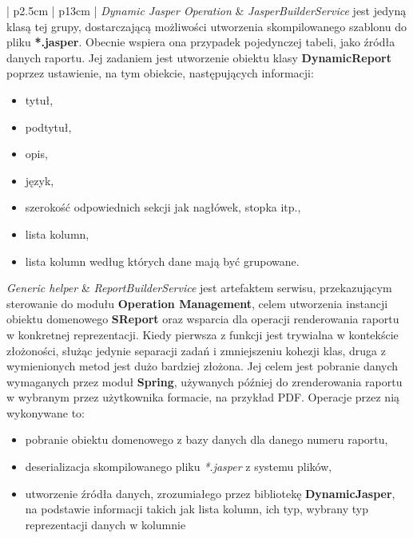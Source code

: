 \begin{center}
\begin{longtable}{| p{2.5cm} | p{13cm} |}
			\emph{Dynamic Jasper Operation}								&
			\emph{JasperBuilderService} jest jedyną klasą tej grupy, dostarczającą możliwości utworzenia skompilowanego
			szablonu do pliku \textbf{*.jasper}. Obecnie wspiera ona przypadek pojedynczej tabeli, jako źródła danych raportu. Jej zadaniem jest
			utworzenie obiektu klasy \textbf{DynamicReport} poprzez ustawienie, na tym obiekcie, następujących informacji:
			\begin{itemize}
				\item tytuł,
				\item podtytuł,
				\item opis,
				\item język,
				\item szerokość odpowiednich sekcji jak nagłówek, stopka itp.,
				\item lista kolumn,
				\item lista kolumn według których dane mają być grupowane.
			\end{itemize}
			\hline
			
			\emph{Generic helper}												&
			\emph{ReportBuilderService} jest artefaktem serwisu, przekazującym sterowanie do modułu
			\textbf{Operation Management}, celem utworzenia instancji obiektu domenowego \textbf{SReport} oraz wsparcia
			dla operacji renderowania raportu w konkretnej reprezentacji. Kiedy pierwsza z funkcji jest trywialna w kontekście złożoności, służąc
			jedynie separacji zadań i zmniejszeniu kohezji klas, druga z wymienionych metod jest dużo bardziej złożona.
			Jej celem jest pobranie danych wymaganych przez moduł \textbf{Spring}, używanych później do zrenderowania raportu 
			w wybranym przez użytkownika formacie, na przykład PDF. Operacje przez nią wykonywane to:
			\begin{itemize}
				\item pobranie obiektu domenowego z bazy danych dla danego numeru raportu, 
				\item deserializacja skompilowanego pliku \textit{*.jasper} z systemu plików,
				\item utworzenie źródła danych, zrozumiałego przez bibliotekę \textbf{DynamicJasper}, na podstawie informacji takich jak lista kolumn, ich typ, wybrany typ reprezentacji danych w kolumnie
			\end{itemize}
			\hline
		\end{longtable}
	\end{center}
				
	
